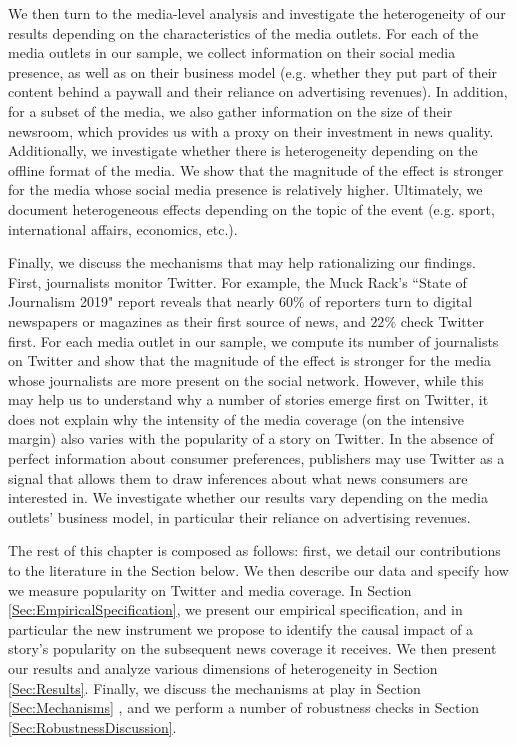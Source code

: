 We then turn to the media-level analysis and investigate the heterogeneity of our results depending on the characteristics of the media outlets. For each of the media outlets in our sample, we collect information on their social media presence, as well as on their business model (e.g. whether they put part of their content behind a paywall and their reliance on advertising revenues). In addition, for a subset of the media, we also gather information on the size of their newsroom, which provides us with a proxy on their investment in news quality. Additionally, we investigate whether there is heterogeneity depending on the offline format of the media. We show that the magnitude of the effect is stronger for the media whose social media presence is relatively higher. Ultimately, we document heterogeneous effects  depending on the topic of the event (e.g. sport, international affairs, economics, etc.).

Finally, we discuss the mechanisms that may help rationalizing our findings. First, journalists monitor Twitter. For example, the Muck Rack’s  ``State of Journalism 2019" report reveals that nearly $60\%$ of reporters turn to digital newspapers or magazines as their first source of news, and $22\%$ check Twitter first. For each media outlet in our sample, we compute its number of journalists on Twitter and show that the magnitude of the effect is stronger for the media whose journalists are more present on the social network. However, while this may help us to understand why a number of stories emerge first on Twitter, it does not explain why the intensity of the media coverage (on the intensive margin) also varies with the popularity of a story on Twitter. In the absence of perfect information about consumer preferences, publishers may use Twitter as a signal that allows them to draw inferences about what news consumers are interested in. We investigate whether our results vary depending on the media outlets' business model, in particular their reliance on advertising revenues.

\medskip
The rest of this chapter is composed as follows: first, we detail our contributions to the literature in the Section below.  We then describe our data and specify how we measure popularity on Twitter and media coverage. In Section \ref{Sec:EmpiricalSpecification}, we present our empirical specification, and in particular the new instrument we propose to identify the causal impact of a story's popularity on the subsequent news coverage it receives. We then present our results and analyze various dimensions of heterogeneity in Section \ref{Sec:Results}. Finally, we discuss the mechanisms at play in Section \ref{Sec:Mechanisms} , and we perform a number of robustness checks in Section \ref{Sec:RobustnessDiscussion}.

